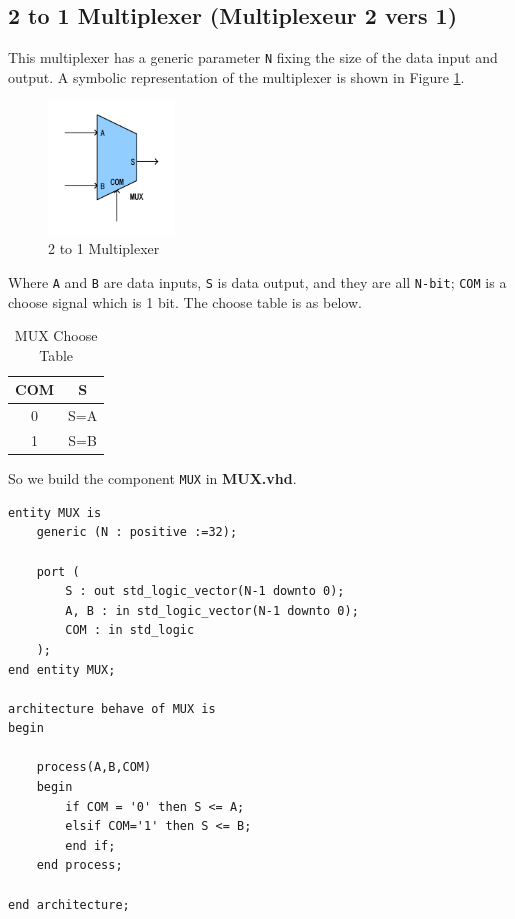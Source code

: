 
\subsection{2 to 1 Multiplexer (Multiplexeur 2 vers 1)}

This multiplexer has a generic parameter \texttt{N} fixing 
the size of the data input and output. A symbolic representation 
of the multiplexer is shown in Figure \ref{fig:mux21}.

\begin{figure}[htp]
    \centering
    \includegraphics[width=0.3\textwidth]{picture/mux21.pdf}
    \caption{2 to 1 Multiplexer}     
    \label{fig:mux21}
\end{figure}

Where \texttt{A} and \texttt{B} are data inputs, \texttt{S} is data output, and they are all \texttt{N-bit};
\texttt{COM} is a choose signal which is 1 bit. The choose table is as below.

\begin{table}[h]
    \centering
    \caption{MUX Choose Table}
    \label{tab: Choose Table}
    \begin{tabular}{@{}cc@{}}
    \toprule
    \textbf{COM} & \textbf{S} \\ \midrule
    0            & S=A        \\
    1            & S=B        \\ \bottomrule
    \end{tabular}
\end{table}

So we build the component \texttt{MUX} in \textbf{MUX.vhd}.

\vspace{3mm}
\begin{lstlisting}[style=vhdl]
entity MUX is 
    generic (N : positive :=32);

    port (
        S : out std_logic_vector(N-1 downto 0);
        A, B : in std_logic_vector(N-1 downto 0);
        COM : in std_logic
    );
end entity MUX;
  
architecture behave of MUX is
begin
  
    process(A,B,COM)
    begin 
        if COM = '0' then S <= A; 
        elsif COM='1' then S <= B; 
        end if; 
    end process; 
  
end architecture;
\end{lstlisting}

